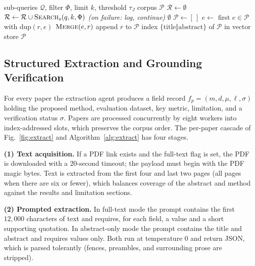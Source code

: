 \documentclass[conference]{IEEEtran}
\newcommand{\cP}{\mathcal{P}}
\newcommand{\cQ}{\mathcal{Q}}
\begin{document}
\begin{algorithm}[!t]
\caption{Retrieval, deduplication, and merge}
\label{alg:search}
\small
\begin{algorithmic}[1]
\Require sub-queries $\cQ$, filter $\Phi$, limit $k$, threshold $\tau_J$
\Ensure corpus $\cP$
\State $\mathcal{R}\gets\emptyset$
\ForAll{$(s,q)\in\{\text{Arx},\text{Bib}\}\times\cQ$ \textbf{in parallel}}
  \State $\mathcal{R}\gets\mathcal{R}\cup\textsc{Search}_s(q,k,\Phi)$ 
  \Statex \hspace{1.3em}\textit{(on failure: log, continue)}
\EndFor
{} \State \Return $\emptyset$ \EndIf
\State $\cP\gets[\,]$
  \State $e\gets$ first $e\in\cP$ with $\mathrm{dup}(r,e)$
   \State $\textsc{Merge}(e,r)$
  \Else \State append $r$ to $\cP$ \EndIf
\EndFor
\State index $\{\text{title}\Vert\text{abstract}\}$ of $\cP$ in vector store
\State \Return $\cP$
\end{algorithmic}
\end{algorithm}

\subsection{Structured Extraction and Grounding Verification}
For every paper the extraction agent produces a field record $f_p=(m,d,\mu,\ell,\sigma)$ holding the proposed method, evaluation dataset, key metric, limitation, and a verification status $\sigma$. Papers are processed concurrently by eight workers into index-addressed slots, which preserves the corpus order. The per-paper cascade of Fig.~\ref{fig:extract} and Algorithm~\ref{alg:extract} has four stages.

\textbf{(1) Text acquisition.} If a PDF link exists and the full-text flag is set, the PDF is downloaded with a 20-second timeout; the payload must begin with the PDF magic bytes. Text is extracted from the first four and last two pages (all pages when there are six or fewer), which balances coverage of the abstract and method against the results and limitation sections.

\textbf{(2) Prompted extraction.} In full-text mode the prompt contains the first $12{,}000$ characters of text and requires, for each field, a value and a short supporting quotation. In abstract-only mode the prompt contains the title and abstract and requires values only. Both run at temperature $0$ and return JSON, which is parsed tolerantly (fences, preambles, and surrounding prose are stripped).
\end{document}
